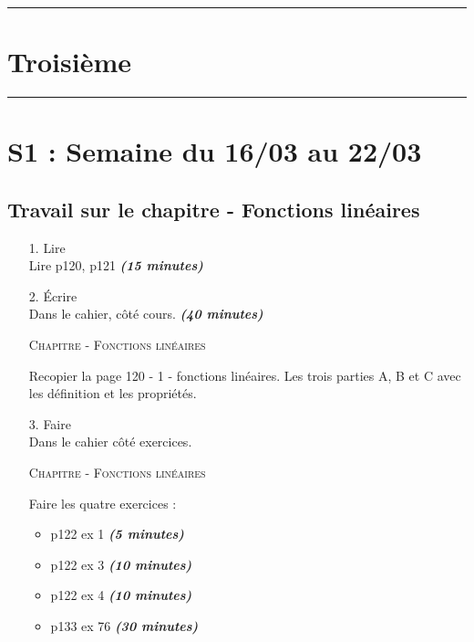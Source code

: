 \documentclass[11pt]{article}
\newcommand{\horrule}[1]{\rule{\linewidth}{#1}} %
\newcommand{\tempsexo}[1]{\textit{\textbf{(#1)}}}
\begin{document}

\newtheorem{Definition}{Définition}
\newtheorem{Theorem}{Théorème}
\newtheorem{Proposition}{Propriété}

\renewcommand{\labelitemi}{$\bullet$}
\renewcommand{\labelitemii}{$\circ$}

\setlength{\columnseprule}{1pt}

\horrule{2px}
\section*{Troisième}
\horrule{2px}

\section{S1 : Semaine du 16/03 au 22/03}

\subsection{Travail sur le chapitre - Fonctions linéaires}

\begin{enumerate}
\item[1.] \huge{Lire} \\ \normalsize 
Lire p120, p121 \tempsexo{15 minutes}

\item[2.] \huge{Écrire} \\ \normalsize 
  Dans le cahier, côté cours. \tempsexo{40 minutes}

	\textsc{Chapitre - Fonctions linéaires}
	
	Recopier la page 120 - 1 - fonctions linéaires. Les trois parties A, B et C avec les définition et les propriétés.

\item[3.] \huge{Faire} \\ \normalsize 
Dans le cahier côté exercices. 

	\textsc{Chapitre - Fonctions linéaires}
	
	Faire les quatre exercices :
	\begin{itemize}
  \item p122 ex 1 \tempsexo{5 minutes}
	\item p122 ex 3 \tempsexo{10 minutes}
	\item p122 ex 4 \tempsexo{10 minutes}
	\item p133 ex 76 \tempsexo{30 minutes}
  \end{itemize}

\end{enumerate}		
\end{document}
